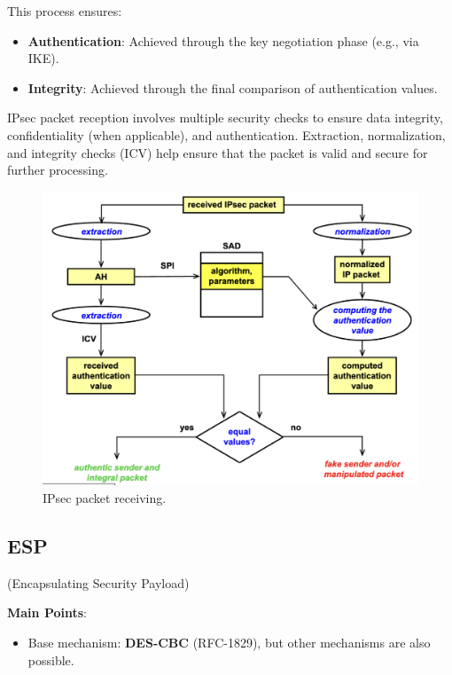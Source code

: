 \begin{tcolorbox}[colback=blue!10!white, colframe=blue!50!white, title=Beware!]
    This process ensures:
    \begin{itemize}
        \item \textbf{Authentication}: Achieved through the key negotiation phase (e.g., via IKE).
        \item \textbf{Integrity}: Achieved through the final comparison of authentication values.
    \end{itemize}
\end{tcolorbox}

\begin{tcolorbox}[colback=lightblue] 
    IPsec packet reception involves multiple security checks to ensure data integrity, confidentiality (when applicable), and authentication. Extraction, normalization, and integrity checks (ICV) help ensure that the packet is valid and secure for further processing.
\end{tcolorbox}

\begin{figure}[H]
  \includegraphics[width=\linewidth]{Images/NetSec/packet_receiving.png}
  \caption{IPsec packet receiving.}
  \label{fig:ipsec_packet_rec}
\end{figure}


\subsection{ESP}
\begin{center}
    (Encapsulating Security Payload)
\end{center}
\textbf{Main Points}:
\begin{itemize}
    \item Base mechanism: \textbf{DES-CBC} (RFC-1829), but other mechanisms are also possible.
\end{itemize}

